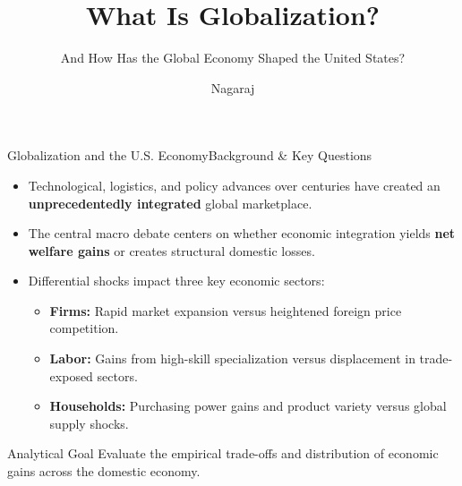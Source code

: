 \documentclass[10pt, aspectratio=169]{beamer}
\title{What Is Globalization?}
\subtitle{And How Has the Global Economy Shaped the United States?}
\author{Nagaraj}
\institute{Department of Economics}
\date{}
\begin{document}
	
	\begin{frame}
		\titlepage
	\end{frame}
	
	\begin{frame}{Globalization and the U.S. Economy}{Background \& Key Questions}
		\begin{itemize}
			\item Technological, logistics, and policy advances over centuries have created an \textbf{unprecedentedly integrated} global marketplace.
			\vspace{0.25cm}
			\item The central macro debate centers on whether economic integration yields \textbf{net welfare gains} or creates structural domestic losses.
			\vspace{0.25cm}
			\item Differential shocks impact three key economic sectors:
			\begin{itemize}
				\vspace{0.1cm}
				\item \textbf{Firms:} Rapid market expansion versus heightened foreign price competition.
				\item \textbf{Labor:} Gains from high-skill specialization versus displacement in trade-exposed sectors.
				\item \textbf{Households:} Purchasing power gains and product variety versus global supply shocks.
			\end{itemize}
		\end{itemize}
		
		\vspace{0.3cm}
		
		\begin{block}{Analytical Goal}
			Evaluate the empirical trade-offs and distribution of economic gains across the domestic economy.
		\end{block}
	\end{frame}
	
\end{document}
